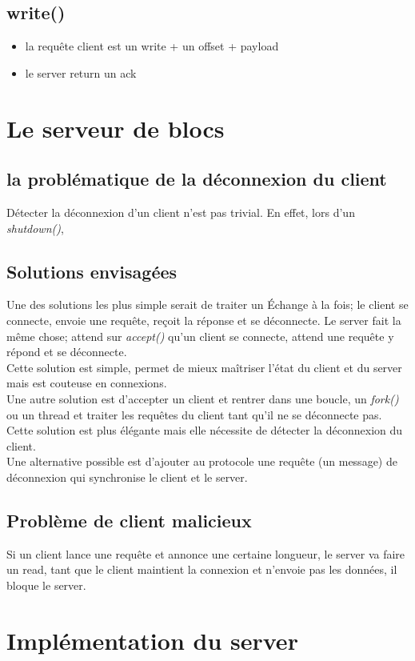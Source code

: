 \documentclass[a4paper,12pt]{article}
\begin{document}
\subsection*{write()}

\begin{itemize}
\item la requête client est un write + un offset + payload
\item le server return un ack
\end{itemize}


\vspace{1cm}

\section{Le serveur de blocs}


\subsection*{la problématique de la déconnexion du client}

Détecter la déconnexion d'un client n'est pas trivial. En effet, lors d'un \emph{shutdown()}, 


\subsection*{Solutions envisagées}

Une des solutions les plus simple serait de traiter un Échange à  la fois; le client se connecte, envoie une requête, reçoit la réponse et se déconnecte. Le server fait la même chose; attend sur \emph{accept()} qu'un client se connecte, attend une requête y répond et se déconnecte.\\

Cette solution est simple, permet de mieux maîtriser l'état du client et du server mais est couteuse en connexions.\\

Une autre solution est d'accepter un client et rentrer dans une boucle, un \emph{fork()} ou un thread et traiter les requêtes du client tant qu'il ne se déconnecte pas. Cette solution est plus élégante mais elle nécessite de détecter la déconnexion du client.\\

Une alternative possible est d'ajouter au protocole une requête (un message) de déconnexion qui synchronise le client et le server.

\subsection*{Problème de client malicieux}

Si un client lance une requête et annonce une certaine longueur, le server va faire un read, tant que le client maintient la connexion et n'envoie pas les données, il bloque le server.\\

\section{Implémentation du server}
 
\end{document}
